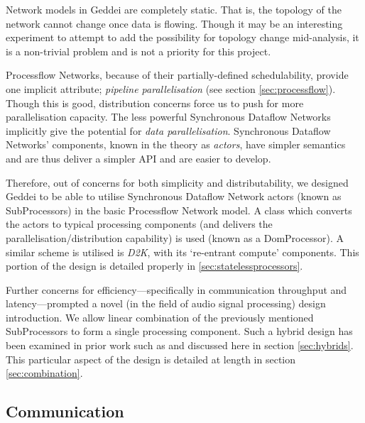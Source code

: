 Network models in Geddei are completely static. That is, the topology of the network cannot change once data is flowing. Though it may be an interesting experiment to attempt to add the possibility for topology change mid-analysis, it is a non-trivial problem and is not a priority for this project.


Processflow Networks, because of their partially-defined schedulability, provide one implicit attribute; \textit{pipeline parallelisation} (see section \ref{sec:processflow}). Though this is good, distribution concerns force us to push for more parallelisation capacity. The less powerful Synchronous Dataflow Networks implicitly give the potential for \textit{data parallelisation}. Synchronous Dataflow Networks' components, known in the theory as \textit{actors}, have simpler semantics and are thus deliver a simpler API and are easier to develop.

Therefore, out of concerns for both simplicity and distributability, we designed Geddei to be able to utilise Synchronous Dataflow Network actors (known as SubProcessors) in the basic Processflow Network model. A class which converts the actors to typical processing components (and delivers the parallelisation/distribution capability) is used (known as a DomProcessor). A similar scheme is utilised is \textit{D2K}, with its `re-entrant compute' components. This portion of the design is detailed properly in \ref{sec:statelessprocessors}.

Further concerns for efficiency---specifically in communication throughput and latency---prompted a novel (in the field of audio signal processing) design introduction. We allow linear combination of the previously mentioned SubProcessors to form a single processing component. Such a hybrid design has been examined in prior work such as \cite{silc97asynchrony} and discussed here in section \ref{sec:hybrids}. This particular aspect of the design is detailed at length in section \ref{sec:combination}.

\subsection{Communication}

